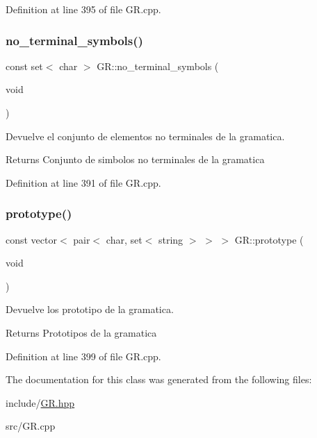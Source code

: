 Definition at line 395 of file G\+R.\+cpp.

\mbox{\label{class_g_r_af5fb76fc7774b978e72bbebf58a81f01}} 
\subsubsection{\texorpdfstring{no\+\_\+terminal\+\_\+symbols()}{no\_terminal\_symbols()}}
{\footnotesize\ttfamily const set$<$ char $>$ G\+R\+::no\+\_\+terminal\+\_\+symbols (\begin{DoxyParamCaption}\item[{void}]{ }\end{DoxyParamCaption})}



Devuelve el conjunto de elementos no terminales de la gramatica. 

\begin{DoxyReturn}{Returns}
Conjunto de simbolos no terminales de la gramatica 
\end{DoxyReturn}


Definition at line 391 of file G\+R.\+cpp.

\mbox{\label{class_g_r_abd4f3481e903edec7b905457e0aadb4b}} 
\subsubsection{\texorpdfstring{prototype()}{prototype()}}
{\footnotesize\ttfamily const vector$<$ pair$<$ char, set$<$ string $>$ $>$ $>$ G\+R\+::prototype (\begin{DoxyParamCaption}\item[{void}]{ }\end{DoxyParamCaption})}



Devuelve los prototipo de la gramatica. 

\begin{DoxyReturn}{Returns}
Prototipos de la gramatica 
\end{DoxyReturn}


Definition at line 399 of file G\+R.\+cpp.



The documentation for this class was generated from the following files\+:\begin{DoxyCompactItemize}
\item 
include/\hyperlink{_g_r_8hpp}{G\+R.\+hpp}\item 
src/G\+R.\+cpp\end{DoxyCompactItemize}
